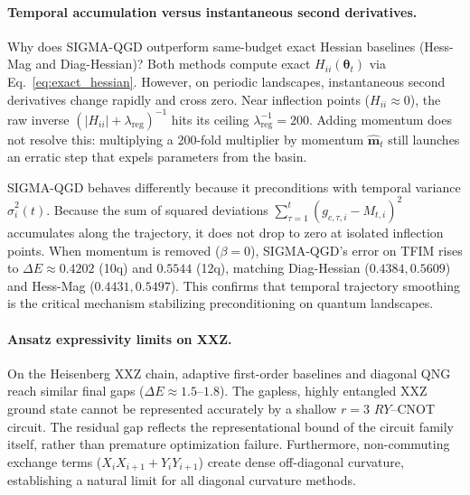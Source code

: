 \documentclass[sn-mathphys,Numbered]{sn-jnl}
\theoremstyle{thmstyleone}
\theoremstyle{thmstyletwo}
\theoremstyle{thmstylethree}
\begin{document}
\paragraph{Temporal accumulation versus instantaneous second derivatives.}
Why does SIGMA-QGD outperform same-budget exact Hessian baselines (Hess-Mag and Diag-Hessian)? Both methods compute exact $H_{ii}(\boldsymbol{\theta}_t)$ via Eq.~\eqref{eq:exact_hessian}. However, on periodic landscapes, instantaneous second derivatives change rapidly and cross zero. Near inflection points ($H_{ii} \approx 0$), the raw inverse $(|H_{ii}| + \lambda_{\text{reg}})^{-1}$ hits its ceiling $\lambda_{\text{reg}}^{-1} = 200$. Adding momentum does not resolve this: multiplying a 200-fold multiplier by momentum $\hat{\mathbf{m}}_t$ still launches an erratic step that expels parameters from the basin.

SIGMA-QGD behaves differently because it preconditions with temporal variance $\hat{\sigma}_i^2(t)$. Because the sum of squared deviations $\sum_{\tau=1}^t (g_{c,\tau,i} - M_{t,i})^2$ accumulates along the trajectory, it does not drop to zero at isolated inflection points. When momentum is removed ($\beta = 0$), SIGMA-QGD's error on TFIM rises to $\Delta E \approx 0.4202$ (10q) and $0.5544$ (12q), matching Diag-Hessian ($0.4384, 0.5609$) and Hess-Mag ($0.4431, 0.5497$). This confirms that temporal trajectory smoothing is the critical mechanism stabilizing preconditioning on quantum landscapes.

\paragraph{Ansatz expressivity limits on XXZ.}
On the Heisenberg XXZ chain, adaptive first-order baselines and diagonal QNG reach similar final gaps ($\Delta E \approx 1.5$--$1.8$). The gapless, highly entangled XXZ ground state cannot be represented accurately by a shallow $r=3$ $RY$--CNOT circuit. The residual gap reflects the representational bound of the circuit family itself, rather than premature optimization failure. Furthermore, non-commuting exchange terms ($X_i X_{i+1} + Y_i Y_{i+1}$) create dense off-diagonal curvature, establishing a natural limit for all diagonal curvature methods.
\end{document}
